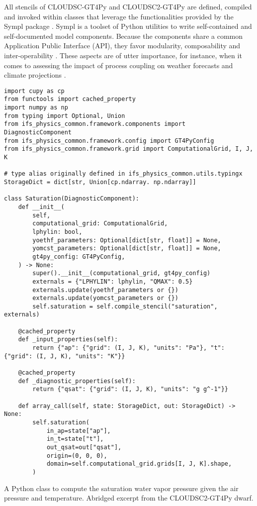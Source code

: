 \documentclass[main.tex]{subfiles}
\begin{document}
        All stencils of CLOUDSC-GT4Py and CLOUDSC2-GT4Py are defined, compiled and invoked within classes that leverage the functionalities provided by the Sympl package \citep{monteiro18}. Sympl is a toolset of Python utilities to write self-contained and self-documented model components. Because the components share a common Application Public Interface (API), they favor modularity, composability and inter-operability \citep{schaer19}. These aspects are of utter importance, for instance, when it comes to assessing the impact of process coupling on weather forecasts and climate projections \citep{ubbiali21}.

        \begin{listing}[t!]
            \begin{verbatim}
import cupy as cp
from functools import cached_property
import numpy as np
from typing import Optional, Union
from ifs_physics_common.framework.components import DiagnosticComponent
from ifs_physics_common.framework.config import GT4PyConfig
from ifs_physics_common.framework.grid import ComputationalGrid, I, J, K

# type alias originally defined in ifs_physics_common.utils.typingx
StorageDict = dict[str, Union[cp.ndarray. np.ndarray]]

class Saturation(DiagnosticComponent):
    def __init__(
        self,
        computational_grid: ComputationalGrid,
        lphylin: bool,
        yoethf_parameters: Optional[dict[str, float]] = None,
        yomcst_parameters: Optional[dict[str, float]] = None,
        gt4py_config: GT4PyConfig,
    ) -> None:
        super().__init__(computational_grid, gt4py_config)
        externals = {"LPHYLIN": lphylin, "QMAX": 0.5}
        externals.update(yoethf_parameters or {})
        externals.update(yomcst_parameters or {})
        self.saturation = self.compile_stencil("saturation", externals)

    @cached_property
    def _input_properties(self):
        return {"ap": {"grid": (I, J, K), "units": "Pa"}, "t": {"grid": (I, J, K), "units": "K"}}

    @cached_property
    def _diagnostic_properties(self):
        return {"qsat": {"grid": (I, J, K), "units": "g g^-1"}}

    def array_call(self, state: StorageDict, out: StorageDict) -> None:
        self.saturation(
            in_ap=state["ap"],
            in_t=state["t"],
            out_qsat=out["qsat"],
            origin=(0, 0, 0),
            domain=self.computational_grid.grids[I, J, K].shape,
        )
            \end{verbatim}
            
            \caption{A Python class to compute the saturation water vapor pressure given the air pressure and temperature. Abridged excerpt from the CLOUDSC2-GT4Py dwarf.}
            \label{lst:saturation-infrastructure}
        \end{listing}
        
\end{document}
